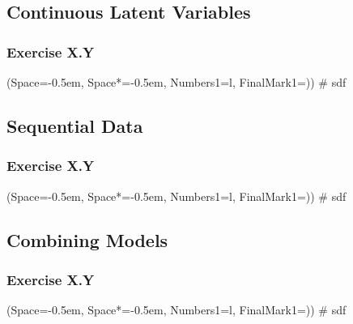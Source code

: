 \documentclass[12pt, a4paper]{article}
\newcommand{\listSpace}{-0.5em}%
\begin{document}
\subsection{Continuous Latent Variables}
\subsubsection*{Exercise X.Y}
\begin{easylist}[enumerate]
	\ListProperties(Space=\listSpace, Space*=\listSpace, Numbers1=l, FinalMark1={)})
	# sdf
\end{easylist}

\subsection{Sequential Data}
\subsubsection*{Exercise X.Y}
\begin{easylist}[enumerate]
	\ListProperties(Space=\listSpace, Space*=\listSpace, Numbers1=l, FinalMark1={)})
	# sdf
\end{easylist}

\subsection{Combining Models}
\subsubsection*{Exercise X.Y}
\begin{easylist}[enumerate]
	\ListProperties(Space=\listSpace, Space*=\listSpace, Numbers1=l, FinalMark1={)})
	# sdf
\end{easylist}





































\end{document}
